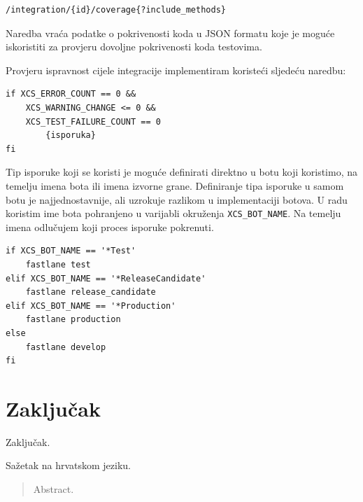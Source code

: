 \documentclass[times, utf8, diplomski, numeric]{fer}
\begin{document}
\begin{verbatim}
/integration/{id}/coverage{?include_methods}
\end{verbatim}

Naredba vraća podatke o pokrivenosti koda u JSON formatu koje je moguće iskoristiti za provjeru dovoljne pokrivenosti koda testovima.

Provjeru ispravnost cijele integracije implementiram koristeći sljedeću naredbu:

\begin{verbatim}
if XCS_ERROR_COUNT == 0 &&
    XCS_WARNING_CHANGE <= 0 &&
    XCS_TEST_FAILURE_COUNT == 0
        {isporuka}
fi
\end{verbatim}

Tip isporuke koji se koristi je moguće definirati direktno u botu koji koristimo, na temelju imena bota ili imena izvorne grane. Definiranje tipa isporuke u samom botu je najjednostavnije, ali uzrokuje razlikom u implementaciji botova. U radu koristim ime bota pohranjeno u varijabli okruženja \verb|XCS_BOT_NAME|. Na temelju imena odlučujem koji proces isporuke pokrenuti.

\begin{verbatim}
if XCS_BOT_NAME == '*Test'
    fastlane test
elif XCS_BOT_NAME == '*ReleaseCandidate'
    fastlane release_candidate
elif XCS_BOT_NAME == '*Production'
    fastlane production
else
    fastlane develop
fi
\end{verbatim}


\chapter{Zaključak}
Zaključak.




\begin{sazetak}
Sažetak na hrvatskom jeziku.

\end{sazetak}

\begin{abstract}
Abstract.

\end{abstract}
\end{document}
